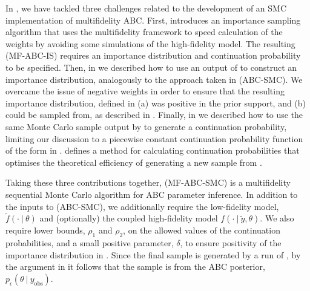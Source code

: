 \documentclass[12pt, onecolumn]{article}
\newcommand{\obs}[1]{#1_{\mathrm{obs}}}
\begin{document}
In , we have tackled three challenges related to the development of an SMC implementation of multifidelity ABC.
First,  introduces an importance sampling algorithm that uses the multifidelity framework to speed calculation of the weights by avoiding some simulations of the high-fidelity model.
The resulting  (MF-ABC-IS) requires an importance distribution and continuation probability to be specified.
Then, in  we described how to use an output of  to construct an importance distribution, analogously to the approach taken in  (ABC-SMC).
We overcame the issue of negative weights in order to ensure that the resulting importance distribution, defined in 
(a) was positive in the prior support,
and (b) could be sampled from, as described in .
Finally, in  we described how to use the same Monte Carlo sample output by  to generate a continuation probability, limiting our discussion to a piecewise constant continuation probability function of the form in .
 defines a method for calculating continuation probabilities that optimises the theoretical efficiency of generating a new sample from .

Taking these three contributions together,  (MF-ABC-SMC) is a multifidelity sequential Monte Carlo algorithm for ABC parameter inference.
In addition to the inputs to  (ABC-SMC), we additionally require the low-fidelity model, $\tilde f(\cdot~|~\theta)$ and (optionally) the coupled high-fidelity model $f(\cdot~|~\tilde y,\theta)$.
We also require lower bounds, $\rho_1$ and $\rho_2$, on the allowed values of the continuation probabilities, and a small positive parameter, $\delta$, to ensure positivity of the importance distribution in .
Since the final sample is generated by a run of , by the argument in  it follows that the sample is from the ABC posterior, $p_\epsilon(\theta~|~\obs y)$.
\end{document}
